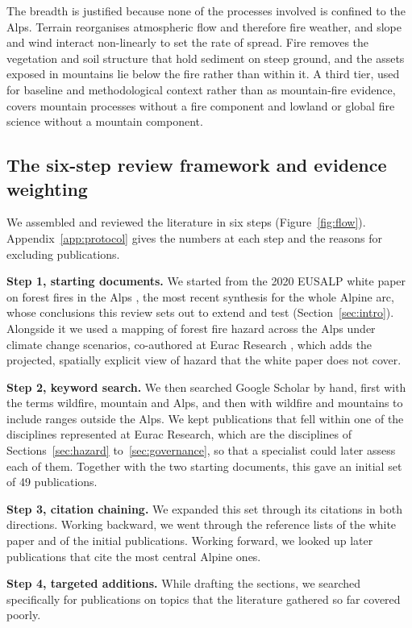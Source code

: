 \documentclass[11pt,a4paper]{article}
\begin{document}
The breadth is justified because none of the processes involved is confined to the Alps. Terrain reorganises atmospheric flow and therefore fire weather, and slope and wind interact non-linearly to set the rate of spread. Fire removes the vegetation and soil structure that hold sediment on steep ground, and the assets exposed in mountains lie below the fire rather than within it. A third tier, used for baseline and methodological context rather than as mountain-fire evidence, covers mountain processes without a fire component and lowland or global fire science without a mountain component.

\subsection{The six-step review framework and evidence weighting}

We assembled and reviewed the literature in six steps (Figure~\ref{fig:flow}). Appendix~\ref{app:protocol} gives the numbers at each step and the reasons for excluding publications.

\textbf{Step 1, starting documents.} We started from the 2020 EUSALP white paper on forest fires in the Alps \citep{muller_forest_2020}, the most recent synthesis for the whole Alpine arc, whose conclusions this review sets out to extend and test (Section~\ref{sec:intro}). Alongside it we used a mapping of forest fire hazard across the Alps under climate change scenarios, co-authored at Eurac Research \citep{gerberding_mapping_2025}, which adds the projected, spatially explicit view of hazard that the white paper does not cover.

\textbf{Step 2, keyword search.} We then searched Google Scholar by hand, first with the terms wildfire, mountain and Alps, and then with wildfire and mountains to include ranges outside the Alps. We kept publications that fell within one of the disciplines represented at Eurac Research, which are the disciplines of Sections~\ref{sec:hazard} to~\ref{sec:governance}, so that a specialist could later assess each of them. Together with the two starting documents, this gave an initial set of 49 publications.

\textbf{Step 3, citation chaining.} We expanded this set through its citations in both directions. Working backward, we went through the reference lists of the white paper and of the initial publications. Working forward, we looked up later publications that cite the most central Alpine ones.

\textbf{Step 4, targeted additions.} While drafting the sections, we searched specifically for publications on topics that the literature gathered so far covered poorly.
\end{document}
